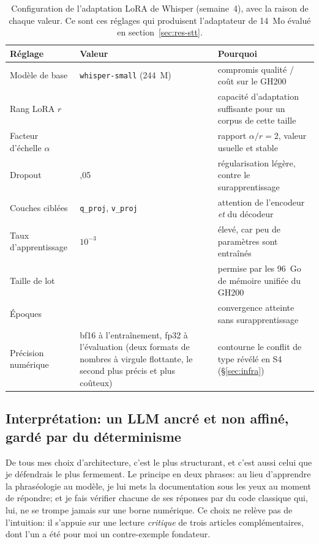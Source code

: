 \documentclass[11pt,a4paper]{article}
\begin{document}
\begin{table}[!htbp]
\centering
\caption[Configuration de l'adaptation LoRA de Whisper (semaine~4)]{Configuration de l'adaptation LoRA de Whisper (semaine~4), avec la raison de chaque
valeur. Ce sont ces réglages qui produisent l'adaptateur de 14~Mo évalué en
section~\ref{sec:res-stt}.}
\label{tab:lora}
\small
\begin{tabular}{>{\raggedright\arraybackslash}p{4.2cm} >{\raggedright\arraybackslash}p{3.4cm} >{\raggedright\arraybackslash}p{7.4cm}}
\toprule
\rowcolor{lightgray}\textbf{Réglage} & \textbf{Valeur} & \textbf{Pourquoi}\\
\midrule
Modèle de base & \texttt{whisper-small} (244~M) & compromis qualité / coût sur le GH200\\
Rang LoRA $r$ & 32 & capacité d'adaptation suffisante pour un corpus de cette taille\\
Facteur d'échelle $\alpha$ & 64 & rapport $\alpha/r = 2$, valeur usuelle et stable\\
Dropout & 0,05 & régularisation légère, contre le surapprentissage\\
Couches ciblées & \texttt{q\_proj}, \texttt{v\_proj} & attention de l'encodeur \emph{et} du décodeur\\
Taux d'apprentissage & $10^{-3}$ & élevé, car peu de paramètres sont entraînés\\
Taille de lot & 48 & permise par les 96~Go de mémoire unifiée du GH200\\
Époques & 3 & convergence atteinte sans surapprentissage\\
Précision numérique & bf16 à l'entraînement, fp32 à l'évaluation (deux formats de nombres à virgule flottante, le second plus précis et plus coûteux) & contourne le conflit de type révélé en S4 (\S\ref{sec:infra})\\
\bottomrule
\end{tabular}
\end{table}

\subsection{Interprétation: un LLM ancré et non affiné, gardé par du déterminisme}
\label{sec:choix-llm}

De tous mes choix d'architecture, c'est le plus structurant, et c'est aussi celui que je défendrais le plus fermement. Le principe en deux phrases: au lieu d'apprendre la phraséologie au modèle, je lui mets la documentation sous les yeux au moment de répondre; et je fais vérifier chacune de ses réponses par du code classique qui, lui, ne se trompe jamais sur une borne numérique. Ce choix ne relève pas de l'intuition: il s'appuie sur une lecture \emph{critique} de trois articles complémentaires, dont l'un a été pour moi un contre-exemple fondateur.
\end{document}
